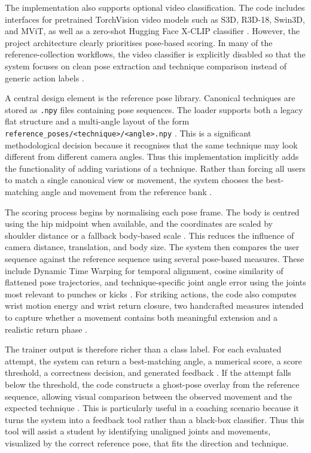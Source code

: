 \documentclass[12pt]{article}
\begin{document}
The implementation also supports optional video classification. The code includes interfaces for pretrained TorchVision video models such as S3D, R3D-18, Swin3D, and MViT, as well as a zero-shot Hugging Face X-CLIP classifier \cite{projectActionRecognition}. However, the project architecture clearly prioritises pose-based scoring. In many of the reference-collection workflows, the video classifier is explicitly disabled so that the system focuses on clean pose extraction and technique comparison instead of generic action labels \cite{projectFrontKickLog,projectSeedLog}.

A central design element is the reference pose library. Canonical techniques are stored as \texttt{.npy} files containing pose sequences. The loader supports both a legacy flat structure and a multi-angle layout of the form \texttt{reference\_poses/<technique>/<angle>.npy} \cite{projectActionRecognition,projectReadme}. This is a significant methodological decision because it recognises that the same technique may look different from different camera angles. Thus this implementation implicitly adds the functionality of adding variations of a technique. Rather than forcing all users to match a single canonical view or movement, the system chooses the best-matching angle and movement from the reference bank \cite{projectActionRecognition}.

The scoring process begins by normalising each pose frame. The body is centred using the hip midpoint when available, and the coordinates are scaled by shoulder distance or a fallback body-based scale \cite{projectActionRecognition}. This reduces the influence of camera distance, translation, and body size. The system then compares the user sequence against the reference sequence using several pose-based measures. These include Dynamic Time Warping for temporal alignment, cosine similarity of flattened pose trajectories, and technique-specific joint angle error using the joints most relevant to punches or kicks \cite{projectActionRecognition}. For striking actions, the code also computes wrist motion energy and wrist return closure, two handcrafted measures intended to capture whether a movement contains both meaningful extension and a realistic return phase \cite{projectActionRecognition}.

The trainer output is therefore richer than a class label. For each evaluated attempt, the system can return a best-matching angle, a numerical score, a score threshold, a correctness decision, and generated feedback \cite{projectActionRecognition}. If the attempt falls below the threshold, the code constructs a ghost-pose overlay from the reference sequence, allowing visual comparison between the observed movement and the expected technique \cite{projectActionRecognition}. This is particularly useful in a coaching scenario because it turns the system into a feedback tool rather than a black-box classifier. Thus this tool will assist a student by identifying unaligned joints and movements, visualized by the correct reference pose, that fits the direction and technique.
\end{document}
